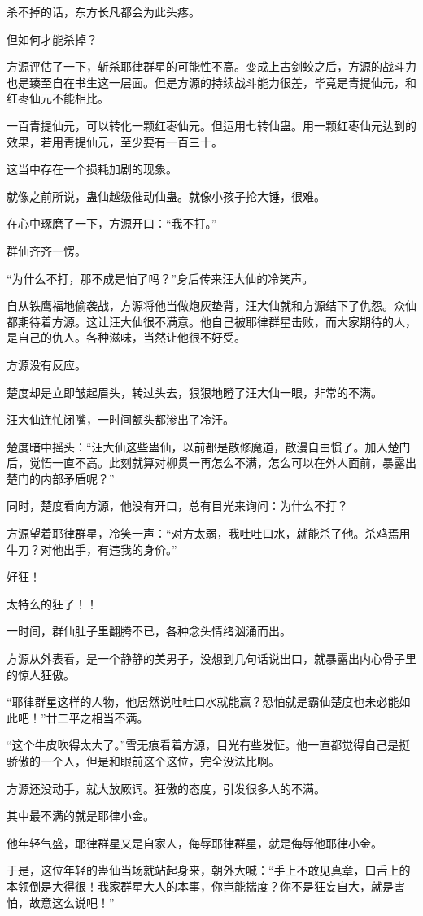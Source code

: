\begin{this_body}
杀不掉的话，东方长凡都会为此头疼。

但如何才能杀掉？

方源评估了一下，斩杀耶律群星的可能性不高。变成上古剑蛟之后，方源的战斗力也是臻至自在书生这一层面。但是方源的持续战斗能力很差，毕竟是青提仙元，和红枣仙元不能相比。

一百青提仙元，可以转化一颗红枣仙元。但运用七转仙蛊。用一颗红枣仙元达到的效果，若用青提仙元，至少要有一百三十。

这当中存在一个损耗加剧的现象。

就像之前所说，蛊仙越级催动仙蛊。就像小孩子抡大锤，很难。

在心中琢磨了一下，方源开口：“我不打。”

群仙齐齐一愣。

“为什么不打，那不成是怕了吗？”身后传来汪大仙的冷笑声。

自从铁鹰福地偷袭战，方源将他当做炮灰垫背，汪大仙就和方源结下了仇怨。众仙都期待着方源。这让汪大仙很不满意。他自己被耶律群星击败，而大家期待的人，是自己的仇人。各种滋味，当然让他很不好受。

方源没有反应。

楚度却是立即皱起眉头，转过头去，狠狠地瞪了汪大仙一眼，非常的不满。

汪大仙连忙闭嘴，一时间额头都渗出了冷汗。

楚度暗中摇头：“汪大仙这些蛊仙，以前都是散修魔道，散漫自由惯了。加入楚门后，觉悟一直不高。此刻就算对柳贯一再怎么不满，怎么可以在外人面前，暴露出楚门的内部矛盾呢？”

同时，楚度看向方源，他没有开口，总有目光来询问：为什么不打？

方源望着耶律群星，冷笑一声：“对方太弱，我吐吐口水，就能杀了他。杀鸡焉用牛刀？对他出手，有违我的身价。”

好狂！

太特么的狂了！！

一时间，群仙肚子里翻腾不已，各种念头情绪汹涌而出。

方源从外表看，是一个静静的美男子，没想到几句话说出口，就暴露出内心骨子里的惊人狂傲。

“耶律群星这样的人物，他居然说吐吐口水就能赢？恐怕就是霸仙楚度也未必能如此吧！”廿二平之相当不满。

“这个牛皮吹得太大了。”雪无痕看着方源，目光有些发怔。他一直都觉得自己是挺骄傲的一个人，但是和眼前这个这位，完全没法比啊。

方源还没动手，就大放厥词。狂傲的态度，引发很多人的不满。

其中最不满的就是耶律小金。

他年轻气盛，耶律群星又是自家人，侮辱耶律群星，就是侮辱他耶律小金。

于是，这位年轻的蛊仙当场就站起身来，朝外大喊：“手上不敢见真章，口舌上的本领倒是大得很！我家群星大人的本事，你岂能揣度？你不是狂妄自大，就是害怕，故意这么说吧！”

\end{this_body}

